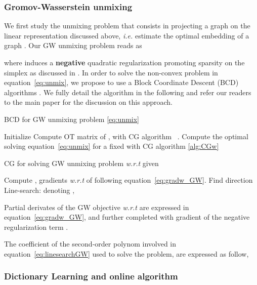 \documentclass{article}
\def\eqref#1{equation~\ref{#1}}
\begin{document}
	
	\subsubsection{Gromov-Wasserstein unmixing}
	We first study the unmixing problem that consists in projecting a graph on the
	linear representation discussed above, \emph{i.e.} estimate the optimal
	embedding  of a graph . Our GW unmixing problem reads as 
	
	
	where  induces a \textbf{negative} quadratic regularization promoting sparsity on the
	simplex as discussed in \citet{li2016methods}. In order to solve the non-convex problem in \eqref{eq:unmix}, we propose to
	use a Block Coordinate Descent (BCD) algorithms \citep{tseng2001convergence}. We fully detail the algorithm in the following and refer our readers to the main paper for the discussion on this approach.
	\begin{algorithm}[H]
		\caption{BCD for GW unmixing problem \ref{eq:unmix}}
		\label{alg:BCD1}
		\begin{algorithmic}[1]
			\STATE Initialize 
			\REPEAT
			\STATE Compute OT matrix  of , with CG algorithm ~\citep[Alg.1 \& 2]{vayer-fused-2018}.
			\STATE Compute the optimal  solving \eqref{eq:unmix} for a fixed
			 with CG algorithm \ref{alg:CGw}
		\end{algorithmic}
	\end{algorithm}
	
	\begin{algorithm}[H]
		\caption{CG for solving GW unmixing problem \emph{w.r.t}  given }
		\label{alg:CGw}
		\begin{algorithmic}[1]
			\REPEAT
			\STATE Compute , gradients  \emph{w.r.t}  of  following \eqref{eq:gradw_GW}.
			\STATE Find direction  
			\STATE Line-search: denoting ,
			
			\STATE 
		\end{algorithmic}
	\end{algorithm}
	
	Partial derivates of the GW objective  \emph{w.r.t}  are expressed in \eqref{eq:gradw_GW}, and further completed with gradient of the negative regularization term .
	
	The coefficient of the second-order polynom involved in \eqref{eq:linesearchGW} used to solve the problem, are expressed as follow,
	
	
	
	\subsubsection{Dictionary Learning and online algorithm}
	
\end{document}
